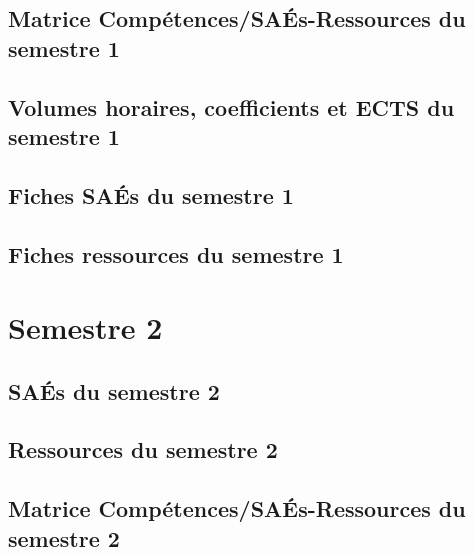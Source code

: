 \documentclass[10pt,lualatex,french]{article}
\begin{document}
\subsection{Matrice Compétences/SAÉs-Ressources du semestre 1}

\scalebox{0.95}{}

\subsection{Volumes horaires, coefficients et ECTS du semestre 1}



\newpage

\subsection{Fiches SAÉs du semestre 1}
\affichageSAE{\sem}
\newpage

\subsection{Fiches ressources du semestre 1}
\affichageRessource{\sem}

\section{Semestre 2}
\def\sem{B} %

\subsection{SAÉs du semestre 2}

\listeTitreSAE{\sem}

\subsection{Ressources du semestre 2}

\listeTitreRessourceIndex{\sem} 

\subsection{Matrice Compétences/SAÉs-Ressources du semestre 2}

\scalebox{0.95}{}
\end{document}
